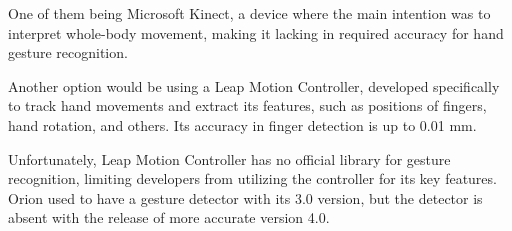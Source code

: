 One of them being Microsoft Kinect, a device where the main intention was to interpret whole-body movement, making it lacking in required accuracy for hand gesture recognition. 

Another option would be using a Leap Motion Controller, developed specifically to track hand movements and extract its features, such as positions of fingers, hand rotation, and others. Its accuracy in finger detection is up to 0.01 mm.

Unfortunately, Leap Motion Controller has no official library for gesture recognition, limiting developers from utilizing the controller for its key features. Orion used to have a gesture detector with its 3.0 version, but the detector is absent with the release of more accurate version 4.0.